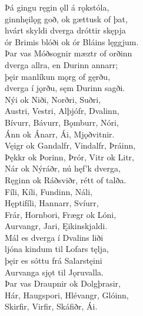 \bva Þá gingu ręgin ǫll \hld á rǫkstóla, \\%
ginnhęilǫg goð, \hld ok gættusk of þat, \\%
hvárt skyldi dverga \hld dróttir skępja \\%
ór Brimis blóði \hld ok ór Bláins lęggjum.\footnotemark[22]
\\%

\bva Þar vas Móðsognir \hld mæztr of orðinn \\%
dverga allra, \hld en Durinn annarr; \\%
þęir manlíkun \hld mǫrg of gęrðu, \\%
dverga í jǫrðu, \hld sęm Durinn sagði.\\%

\bva Nýi ok Niði, \hld Norðri, Suðri, \\%
Austri, Vestri, \hld Alþjófr, Dvalinn, \\%
Bívurr, Bávurr, \hld Bǫmburr, Nóri, \\%
Ánn ok Ánarr, \hld Ái, Mjǫðvitnir.\\%

\bva Vęigr ok Gandalfr, \hld Vindalfr, Þráinn, \\%
Þękkr ok Þorinn, \hld Þrór, Vitr ok Litr, \\%
Nár ok Nýráðr, \hld nú hęf'k dverga, \\%
Ręginn ok Ráðsviðr, \hld rétt of talða.\\%

\bva Fíli, Kíli, \hld Fundinn, Náli, \\%
Hęptifíli, \hld Hannarr, Svíurr, \\%
Frár, Hornbori, \hld Frægr ok Lóni, \\%
Aurvangr, Jari, \hld Ęikinskjaldi.\\%

\bva Mál es dverga \hld í Dvalins liði \\%
ljóna kindum \hld til Lofars tęlja, \\%
þęir es sóttu \hld frá Salarstęini \\%
Aurvanga sjǫt \hld til Jǫruvalla.\\%

\bva Þar vas Draupnir \hld ok Dolgþrasir, \\%
Hár, Haugspori, \hld Hlévangr, Glóinn, \\%
Skirfir, Virfir, \hld Skáfiðr, Ái.\\%

